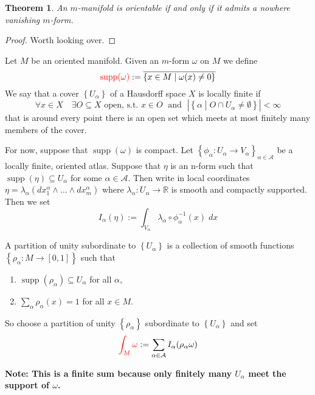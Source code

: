 \documentclass[11pt]{article}
\newcommand{\defeq}{:=}
\DeclareMathOperator{\supp}{\textrm{supp}}
\newcommand{\relmiddle}[1]{\mathrel{}\middle#1\mathrel{}}
\newcommand{\rmv}{\relmiddle|}
\newcommand{\R}{\mathbb{R}}
\newenvironment{defin}
	{\begin{mdframed}[backgroundcolor=white, roundcorner=5pt, linewidth=1pt]
		\setlength{\parindent}{0pt}
		}
	{\end{mdframed}}
\newcommand{\mdf}[1]{{\color{red} #1}}
\newenvironment{note}
	{\begin{mdframed}[backgroundcolor=white, linecolor=red, roundcorner=5pt, linewidth=1pt]\bfseries{Note:}\normalfont}
	{\end{mdframed}}
\newtheorem{theorem}{Theorem}[section]
\begin{document}
\begin{theorem}
An $m$-manifold is orientable if and only if it admits a nowhere vanishing $m$-form.
\end{theorem}

\begin{proof}
Worth looking over.
\end{proof}

\begin{defin}
Let $M$ be an oriented manifold.
Given an $m$-form $\omega$ on $M$ we define
\[
\mdf{\supp(\omega)}\defeq\overline{\left\{ x\in M \rmv \omega(x) \neq 0\right\}}
\]
We say that a cover $\left\{ U_\alpha\right\}$ of a Hausdorff space $X$ is \mdf{locally finite} if
\[
	\forall x \in X \quad \exists O\subseteq X\text{ open, s.t. }x\in O \; \text{ and } \; \left|\left\{ \alpha \rmv O\cap U_\alpha\neq\emptyset\right\}\right|< \infty
\]
that is around every point there is an open set which meets at most finitely many members of the cover.
\end{defin}

For now, suppose that $\supp(\omega)$ is compact.
Let $\left\{ \phi_\alpha: U_\alpha \to V_\alpha\right\}_{\alpha\in\mathcal{A}}$ be a locally finite, oriented atlas.
Suppose that $\eta$ is an n-form such that $\supp(\eta)\subseteq U_\alpha$ for some $\alpha\in\mathcal{A}$.
Then write in local coordinates $\eta = \lambda_\alpha(dx_1^\alpha \wedge \dots \wedge dx_m^\alpha)$ where $\lambda_\alpha:U_\alpha\to\R$ is smooth and compactly supported.
Then we set
\[
	I_\alpha(\eta)\defeq \int_{V_\alpha} \lambda_\alpha \circ \phi_\alpha^{-1}(x) \; dx
\]

\begin{defin}
	A \mdf{partition of unity subordinate to} $\left\{ U_\alpha\right\}$ is a collection of smooth functions $\left\{ \rho_\alpha: M \to [0, 1]\right\}$ such that
	\begin{enumerate}
		\item $\supp(\rho_\alpha)\subseteq U_\alpha$ for all $\alpha$,
		\item $\sum_{\alpha}\rho_\alpha(x)=1$ for all $x\in M$.
	\end{enumerate}
\end{defin}

So choose a partition of unity $\left\{ \rho_\alpha\right\}$ subordinate to $\left\{ U_\alpha\right\}$ and set
\[
	\mdf{\int_M \omega} \defeq \sum_{\alpha\in\mathcal{A}} I_\alpha(\rho_\alpha \omega)
\]
\begin{note}
	This is a finite sum because only finitely many $U_\alpha$ meet the support of $\omega$.
\end{note}
\end{document}
